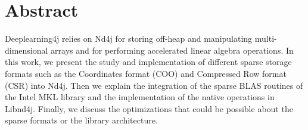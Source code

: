 

\cleardoublepage
\chapter*{Abstract}

Deeplearning4j relies on Nd4j for storing off-heap and manipulating multi-dimensional arrays and for performing accelerated linear algebra operations. In this work, we present the study and implementation of different sparse storage formats such as the Coordinates format (COO) and Compressed Row format (CSR) into Nd4j. Then we explain the integration of the sparse BLAS routines of the Intel MKL library and the implementation of the native operations in Libnd4j. Finally, we discuss the optimizations that could be possible about the sparse formats or the library architecture.



\vskip0.5cm





